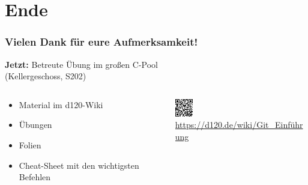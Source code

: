 \documentclass[accentcolor=tud8b,colorbacktitle,inverttitle,landscape,german,presentation,t]{tudbeamer}
\begin{document}
\section*{Ende}
		\begin{frame}
			\frametitle{Vielen Dank für eure Aufmerksamkeit!}
			\centering
			\Large{\textbf{Jetzt:} Betreute Übung im großen C-Pool\\(Kellergeschoss, S202)}\\
			\begin{columns}[T]
				\begin{column}{.5\textwidth}
					\begin{itemize}
						\item Material im d120-Wiki
						\item Übungen
						\item Folien
						\item Cheat-Sheet mit den wichtigsten Befehlen
					\end{itemize}
				\end{column}
				\begin{column}{.5\textwidth}
					\centering
					\includegraphics[scale=4.5]{wiki_href_qr}\\
					{\small\href{https://d120.de/wiki/Git_Einführung}{https://d120.de/wiki/Git\_Einführung}}
				\end{column}
			\end{columns}
		\end{frame}
		
		
\end{document}
